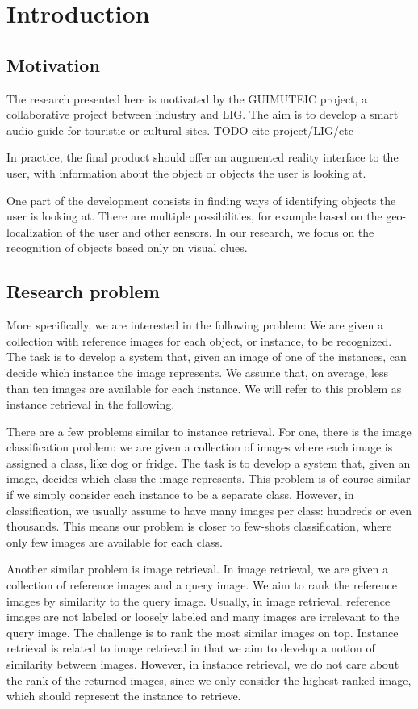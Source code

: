 
\chapter{Introduction}
\section{Motivation}
The research presented here is motivated by the GUIMUTEIC project,
a collaborative project between industry and LIG. The
aim is to develop a smart audio-guide for touristic or cultural sites.
TODO cite project/LIG/etc

In practice, the final product should offer an augmented reality
interface to the user, with information about the object or objects
the user is looking at.

One part of the development consists in finding ways of identifying
objects the user is looking at. There are multiple possibilities,
for example based on the geo-localization of the user and other sensors.
In our research, we focus on the recognition of objects based
only on visual clues.

\section{Research problem}
More specifically, we are interested in the following problem:
We are given a collection with reference images for each object,
or instance, to be recognized. The task is to develop a system that,
given an image of one of the instances, can decide which instance
the image represents. We assume that, on average, less than ten images
are available for each instance.
We will refer to this problem as instance retrieval in the following.

There are a few problems similar to instance retrieval. For one, there is
the image classification problem: we are given a collection of images
where each image is assigned a class, like dog or fridge.
The task is to develop a system that, given an image, decides which
class the image represents.
This problem is of course similar if we simply consider each instance
to be a separate class. However, in classification, we usually
assume to have many images per class: hundreds or even thousands.
This means our problem is closer to few-shots classification, where
only few images are available for each class.

Another similar problem is image retrieval. In image retrieval,
we are given a collection of reference images and a query image.
We aim to rank the reference images by similarity to the query image.
Usually, in image retrieval, reference images are not labeled or loosely
labeled and many images are irrelevant to the query image. The challenge
is to rank the most similar images on top.
Instance retrieval is related to image retrieval in that we aim to
develop a notion of similarity between images. However, in instance
retrieval, we do not care about the rank of the returned images, since
we only consider the highest ranked image, which should represent the
instance to retrieve.

